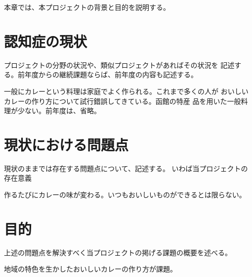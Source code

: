 \documentclass[../report]{subfiles}
\begin{document}
本章では、本プロジェクトの背景と目的を説明する。

\section{認知症の現状}
\begin{hissu}
プロジェクトの分野の状況や、類似プロジェクトがあればその状況を
記述する。前年度からの継続課題ならば、前年度の内容も記述する。
\end{hissu}
一般にカレーという料理は家庭でよく作られる。これまで多くの人が
おいしいカレーの作り方について試行錯誤してきている。函館の特産
品を用いた一般料理が少ない。前年度は、省略。

\section{現状における問題点}
\begin{hissu}
現状のままでは存在する問題点について、記述する。
いわば当プロジェクトの存在意義
\end{hissu}
作るたびにカレーの味が変わる。いつもおいしいものができるとは限らない。

\section{目的}
\begin{hissu}
 上述の問題点を解決すべく当プロジェクトの掲げる課題の概要を述べる。
\end{hissu}
地域の特色を生かしたおいしいカレーの作り方が課題。
\end{document}
